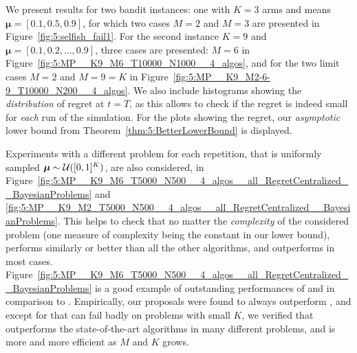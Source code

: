 %

We present results for two bandit instances: one with $K=3$ arms and means
$\boldsymbol{\mu} = [0.1, 0.5, 0.9]$, for which two cases $M=2$ and $M=3$ are presented in Figure~\ref{fig:5:selfish_fail1}. For the second instance $K=9$ and $\boldsymbol{\mu} = [0.1, 0.2, \dots, 0.9]$,
three cases are presented: $M=6$ in Figure~\ref{fig:5:MP__K9_M6_T10000_N1000__4_algos},
and for the two limit cases $M=2$ and $M=9=K$ in Figure~\ref{fig:5:MP__K9_M2-6-9_T10000_N200__4_algos}.
%
We also include histograms showing the \emph{distribution} of regret at $t=T$,
as this allows to check if the regret is indeed small for \emph{each} run of the simulation.
%
For the plots showing the regret, our \emph{asymptotic} lower bound from Theorem~\ref{thm:5:BetterLowerBound} is displayed.

Experiments with a different problem for each repetition,
that is uniformly sampled $\boldsymbol{\mu} \sim \mathcal{U}([0,1]^K)$,
are also considered, in Figure~\ref{fig:5:MP__K9_M6_T5000_N500__4_algos__all_RegretCentralized__BayesianProblems} and \ref{fig:5:MP__K9_M2_T5000_N500__4_algos__all_RegretCentralized__BayesianProblems}.
This helps to check that no matter the \emph{complexity} of the considered problem (one measure of complexity being the constant in our lower bound),
\MCTopM{} performs similarly or better than all the other algorithms,
and \Selfish{} outperforms \rhoRand{} in most cases.
Figure~\ref{fig:5:MP__K9_M6_T5000_N500__4_algos__all_RegretCentralized__BayesianProblems} is a good example
of outstanding performances of \MCTopM{} and \Selfish{} in comparison to \rhoRand{}.
%
Empirically, our proposals were found to always outperform \rhoRand{}, and except for \Selfish{} that can fail badly on problems with small $K$,
we verified that \MCTopM{} outperforms the state-of-the-art algorithms in many different problems, and is more and more efficient as $M$ and $K$ grows.



